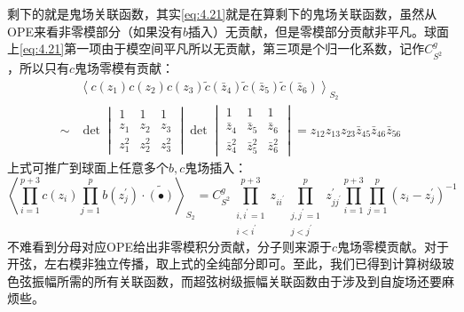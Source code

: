 剩下的就是鬼场关联函数，其实\ref{eq:4.21}就是在算剩下的鬼场关联函数，虽然从OPE来看非零模部分（如果没有$b$插入）无贡献，但是零模部分贡献非平凡。球面上\ref{eq:4.21}第一项由于模空间平凡所以无贡献，第三项是个归一化系数，记作$C^g_{S^2}$，所以只有$c$鬼场零模有贡献：
\begin{equation}
\begin{aligned}
		&\left\langle c(z_1)c(z_2)c(z_3)\tilde{c}(\bar{z}_4)\tilde{c}(\bar{z}_5)\tilde{c}(\bar{z}_6)\right\rangle_{S_2}\\
	\sim&\det\begin{vmatrix}1&1&1\\z_1&z_2&z_3\\z_1^2&z_2^2&z_3^2\end{vmatrix}\det\begin{vmatrix}1&1&1\\\bar{z}_4&\bar{z}_5&\bar{z}_6\\\bar{z}_4^2&\bar{z}_5^2&\bar{z}_6^2\end{vmatrix}=z_{12}z_{13}z_{23}\bar{z}_{45}\bar{z}_{46}\bar{z}_{56}
\end{aligned}
\end{equation}
上式可推广到球面上任意多个$b,c$鬼场插入：
\begin{equation}
	\left\langle\prod_{i=1}^{p+3}c(z_i)\prod_{j=1}^pb(z_j^{\prime})\cdot\widetilde{(\bullet)}\right\rangle_{S_2}=C^g_{S^2}\prod_{\substack{i,i^{\prime}=1\\i<i^{\prime}}}^{p+3}z_{ii^{\prime}}\prod_{\substack{j,j^{\prime}=1\\j<j^{\prime}}}^pz_{jj^{\prime}}^{\prime}\prod_{i=1}^{p+3}\prod_{j=1}^p(z_i-z_j^{\prime})^{-1}
\end{equation}
不难看到分母对应OPE给出非零模积分贡献，分子则来源于$c$鬼场零模贡献。对于开弦，左右模非独立传播，取上式的全纯部分即可。至此，我们已得到计算树级玻色弦振幅所需的所有关联函数，而超弦树级振幅关联函数由于涉及到自旋场还要麻烦些。

